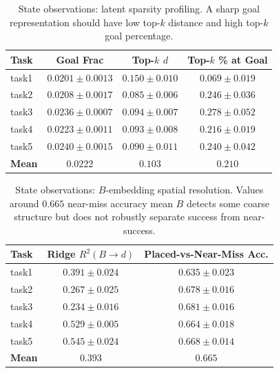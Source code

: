 \documentclass{article}
\begin{document}
\begin{table}[H]
\centering
\small
\caption{State observations: latent sparsity profiling. A sharp goal representation should have low top-$k$ distance and high top-$k$ goal percentage.}
\label{tab:state-sparsity-app}
\vspace{0.25em}
\begin{tabular}{lccc}
\toprule
\textbf{Task} & \textbf{Goal Frac} & \textbf{Top-$k$ $d$} & \textbf{Top-$k$ \% at Goal} \\
\midrule
task1 & $0.0201 \pm 0.0013$ & $0.150 \pm 0.010$ & $0.069 \pm 0.019$ \\
task2 & $0.0208 \pm 0.0017$ & $0.085 \pm 0.006$ & $0.246 \pm 0.036$ \\
task3 & $0.0236 \pm 0.0007$ & $0.094 \pm 0.007$ & $0.278 \pm 0.052$ \\
task4 & $0.0223 \pm 0.0011$ & $0.093 \pm 0.008$ & $0.216 \pm 0.019$ \\
task5 & $0.0240 \pm 0.0015$ & $0.090 \pm 0.011$ & $0.240 \pm 0.042$ \\
\midrule
\textbf{Mean} & $\mathbf{0.0222}$ & $\mathbf{0.103}$ & $\mathbf{0.210}$ \\
\bottomrule
\end{tabular}
\end{table}

\begin{table}[H]
\centering
\small
\caption{State observations: $B$-embedding spatial resolution. Values around $0.665$ near-miss accuracy mean $B$ detects some coarse structure but does not robustly separate success from near-success.}
\label{tab:state-b-resolution-app}
\vspace{0.25em}
\begin{tabular}{lcc}
\toprule
\textbf{Task} & \textbf{Ridge $R^2(B \to d)$} & \textbf{Placed-vs-Near-Miss Acc.} \\
\midrule
task1 & $0.391 \pm 0.024$ & $0.635 \pm 0.023$ \\
task2 & $0.267 \pm 0.025$ & $0.678 \pm 0.016$ \\
task3 & $0.234 \pm 0.016$ & $0.681 \pm 0.016$ \\
task4 & $0.529 \pm 0.005$ & $0.664 \pm 0.018$ \\
task5 & $0.545 \pm 0.024$ & $0.668 \pm 0.014$ \\
\midrule
\textbf{Mean} & $\mathbf{0.393}$ & $\mathbf{0.665}$ \\
\bottomrule
\end{tabular}
\end{table}
\end{document}
